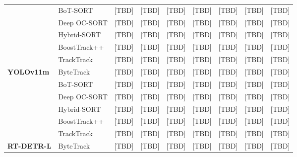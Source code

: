 \begin{table}[htbp]
\begin{tabular}{llccccccc}
                      & BoT-SORT         & [TBD]              & [TBD]              & [TBD]              & [TBD]              & [TBD]              & [TBD]         & [TBD]        \\
                      & Deep OC-SORT     & [TBD]              & [TBD]              & [TBD]              & [TBD]              & [TBD]              & [TBD]         & [TBD]        \\
                      & Hybrid-SORT      & [TBD]              & [TBD]              & [TBD]              & [TBD]              & [TBD]              & [TBD]         & [TBD]        \\
                      & BoostTrack++     & [TBD]              & [TBD]              & [TBD]              & [TBD]              & [TBD]              & [TBD]         & [TBD]        \\
                      & TrackTrack       & [TBD]              & [TBD]              & [TBD]              & [TBD]              & [TBD]              & [TBD]         & [TBD]        \\
    \midrule
    \multirow{6}{*}{\textbf{YOLOv11m}}
                      & ByteTrack        & [TBD]              & [TBD]              & [TBD]              & [TBD]              & [TBD]              & [TBD]         & [TBD]        \\
                      & BoT-SORT         & [TBD]              & [TBD]              & [TBD]              & [TBD]              & [TBD]              & [TBD]         & [TBD]        \\
                      & Deep OC-SORT     & [TBD]              & [TBD]              & [TBD]              & [TBD]              & [TBD]              & [TBD]         & [TBD]        \\
                      & Hybrid-SORT      & [TBD]              & [TBD]              & [TBD]              & [TBD]              & [TBD]              & [TBD]         & [TBD]        \\
                      & BoostTrack++     & [TBD]              & [TBD]              & [TBD]              & [TBD]              & [TBD]              & [TBD]         & [TBD]        \\
                      & TrackTrack       & [TBD]              & [TBD]              & [TBD]              & [TBD]              & [TBD]              & [TBD]         & [TBD]        \\
    \midrule
    \multirow{6}{*}{\textbf{RT-DETR-L}}
                      & ByteTrack        & [TBD]              & [TBD]              & [TBD]              & [TBD]              & [TBD]              & [TBD]         & [TBD]        \\

\end{tabular}
\end{table}
